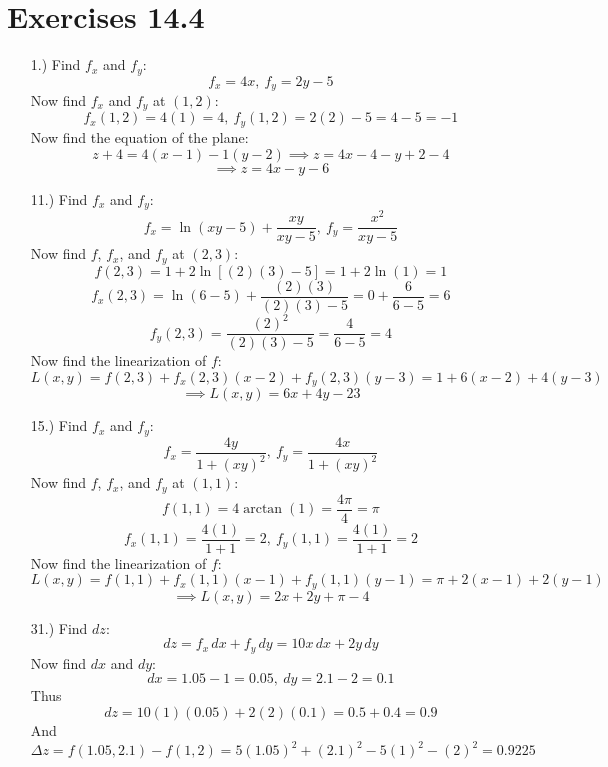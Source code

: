 \documentclass[12pt]{article}
\begin{document}
\pagestyle{fancy}
\fancyhead{}

\normalsize
\section*{Exercises 14.4}
\begin{itemize}
    \item [1.)] Find $f_x$ and $f_y$:
    \[f_x=4x,\ f_y=2y-5\]
    Now find $f_x$ and $f_y$ at $(1,2)$:
    \[f_x(1,2)=4(1)=4,\ f_y(1,2)=2(2)-5=4-5=-1\]
    Now find the equation of the plane:
    \[z+4=4(x-1)-1(y-2)\implies z=4x-4-y+2-4\]
    \[\implies z=4x-y-6\]

    \item [11.)] Find $f_x$ and $f_y$:
    \[f_x=\ln(xy-5)+\frac{xy}{xy-5},\ f_y=\frac{x^2}{xy-5}\]
    Now find $f$, $f_x$, and $f_y$ at $(2,3)$:
    \[f(2,3)=1+2\ln[(2)(3)-5]=1+2\ln(1)=1\]
    \[f_x(2,3)=\ln(6-5)+\frac{(2)(3)}{(2)(3)-5}=0+\frac{6}{6-5}=6\]
    \[f_y(2,3)=\frac{(2)^2}{(2)(3)-5}=\frac{4}{6-5}=4\]
    Now find the linearization of $f$:
    \[L(x,y)=f(2,3)+f_x(2,3)(x-2)+f_y(2,3)(y-3)=1+6(x-2)+4(y-3)\]
    \[\implies L(x,y)=6x+4y-23\]

    \item [15.)] Find $f_x$ and $f_y$:
    \[f_x=\frac{4y}{1+(xy)^2},\ f_y=\frac{4x}{1+(xy)^2}\]
    Now find $f$, $f_x$, and $f_y$ at $(1,1)$:
    \[f(1,1)=4\arctan(1)=\frac{4\pi}{4}=\pi\]
    \[f_x(1,1)=\frac{4(1)}{1+1}=2,\ f_y(1,1)=\frac{4(1)}{1+1}=2\]
    Now find the linearization of $f$:
    \[L(x,y)=f(1,1)+f_x(1,1)(x-1)+f_y(1,1)(y-1)=\pi+2(x-1)+2(y-1)\]
    \[\implies L(x,y)=2x+2y+\pi-4\]

    \item [31.)] Find $dz$:
    \[dz=f_x\,dx+f_y\,dy=10x\,dx+2y\,dy\]
    Now find $dx$ and $dy$:
    \[dx=1.05-1=0.05,\ dy=2.1-2=0.1\]
    Thus
    \[dz=10(1)(0.05)+2(2)(0.1)=0.5+0.4=0.9\]
    And
    \[\Delta z=f(1.05,2.1)-f(1,2)=5(1.05)^2+(2.1)^2-5(1)^2-(2)^2=0.9225\]
\end{itemize}
\end{document}
